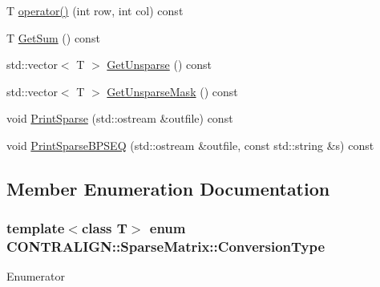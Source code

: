 \begin{DoxyCompactItemize}
\item 
T \hyperlink{class_c_o_n_t_r_a_l_i_g_n_1_1_sparse_matrix_ad8053dc37c78543b50b9f72ac0628e50}{operator()} (int row, int col) const 
\item 
T \hyperlink{class_c_o_n_t_r_a_l_i_g_n_1_1_sparse_matrix_a02b62e846e2410a66932b340ea7d7305}{Get\+Sum} () const 
\item 
std\+::vector$<$ T $>$ \hyperlink{class_c_o_n_t_r_a_l_i_g_n_1_1_sparse_matrix_a253f2ead727aa10eb74d0e1beab66bdd}{Get\+Unsparse} () const 
\item 
std\+::vector$<$ T $>$ \hyperlink{class_c_o_n_t_r_a_l_i_g_n_1_1_sparse_matrix_a44399ef13fa7df1d42226013f1c6d453}{Get\+Unsparse\+Mask} () const 
\item 
void \hyperlink{class_c_o_n_t_r_a_l_i_g_n_1_1_sparse_matrix_a3db5914e4a3da5f5a05cf66ca4c281e1}{Print\+Sparse} (std\+::ostream \&outfile) const 
\item 
void \hyperlink{class_c_o_n_t_r_a_l_i_g_n_1_1_sparse_matrix_a899db1a83f5d4882a26c61b3644db0f0}{Print\+Sparse\+B\+P\+S\+E\+Q} (std\+::ostream \&outfile, const std\+::string \&s) const 
\end{DoxyCompactItemize}


\subsection{Member Enumeration Documentation}
\hypertarget{class_c_o_n_t_r_a_l_i_g_n_1_1_sparse_matrix_a33a2e14b850b1767494ef115a660cf1c}{
\subsubsection[{Conversion\+Type}]{\setlength{\rightskip}{0pt plus 5cm}template$<$class T$>$ enum {\bf C\+O\+N\+T\+R\+A\+L\+I\+G\+N\+::\+Sparse\+Matrix\+::\+Conversion\+Type}}}\label{class_c_o_n_t_r_a_l_i_g_n_1_1_sparse_matrix_a33a2e14b850b1767494ef115a660cf1c}
\begin{Desc}
\item[Enumerator]\par
\begin{description}
\item[{\em 
\hypertarget{class_c_o_n_t_r_a_l_i_g_n_1_1_sparse_matrix_a33a2e14b850b1767494ef115a660cf1ca8c1a1a563278991caa877ce886ca29c9}{T\+R\+A\+N\+S\+P\+O\+S\+E}\label{class_c_o_n_t_r_a_l_i_g_n_1_1_sparse_matrix_a33a2e14b850b1767494ef115a660cf1ca8c1a1a563278991caa877ce886ca29c9}
}]\end{description}
\end{Desc}



